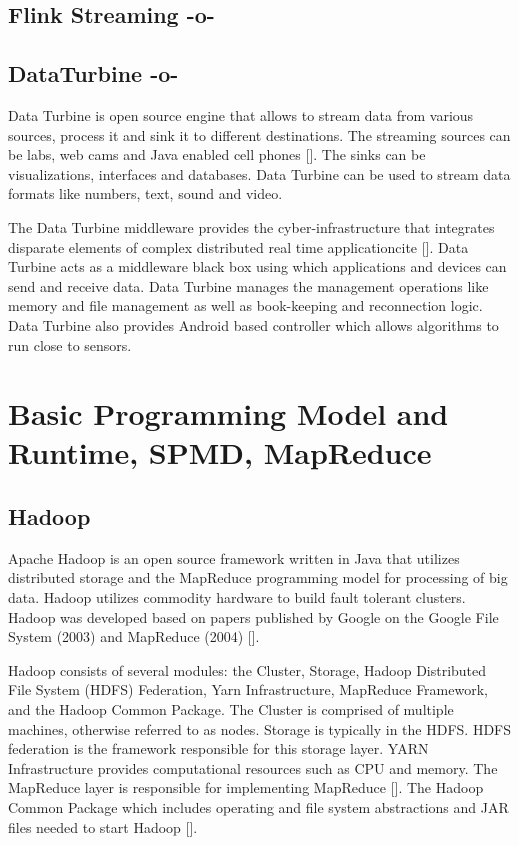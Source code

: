      
\subsection{Flink Streaming -o-}



\subsection{DataTurbine -o-}

Data Turbine is open source engine that allows to stream data from
various sources, process it and sink it to different destinations. The
streaming sources can be labs, web cams and Java enabled cell
phones [\cite{www-data-turbine}].  The sinks can be visualizations,
interfaces and databases.  Data Turbine can be used to stream data
formats like numbers, text, sound and video.

The Data Turbine middleware provides the cyber-infrastructure that
integrates disparate elements of complex distributed real time
applicationcite [\cite{osdt-ecologicalsociety}]. Data Turbine acts as a
middleware black box using which applications and devices can send and
receive data. Data Turbine manages the management operations like
memory and file management as well as book-keeping and reconnection
logic.  Data Turbine also provides Android based controller which
allows algorithms to run close to sensors.




\section{Basic Programming Model and Runtime, SPMD, MapReduce}


\subsection{Hadoop}

Apache Hadoop is an open source framework written in Java that
utilizes distributed storage and the MapReduce programming model for
processing of big data. Hadoop utilizes commodity hardware to build
fault tolerant clusters.  Hadoop was developed based on papers
published by Google on the Google File System (2003) and MapReduce
(2004) [\cite{www-wikihadoop}].

Hadoop consists of several modules: the Cluster, Storage, Hadoop
Distributed File System (HDFS) Federation, Yarn Infrastructure,
MapReduce Framework, and the Hadoop Common Package.  The Cluster is
comprised of multiple machines, otherwise referred to as nodes.
Storage is typically in the HDFS.  HDFS federation is the framework
responsible for this storage layer.  YARN Infrastructure provides
computational resources such as CPU and memory. The MapReduce layer is
responsible for implementing MapReduce [\cite{www-hadooparch2}].  The
Hadoop Common Package which includes operating and file system
abstractions and JAR files needed to start Hadoop
 [\cite{www-wikihadoop}].


